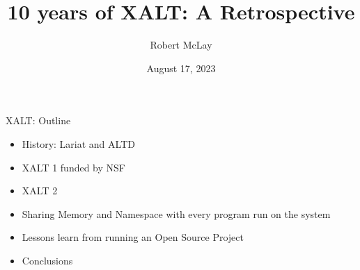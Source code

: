 \documentclass{beamer}
\begin{document}
\title[XALT]{10 years of XALT: A Retrospective}
\author{Robert McLay}
\date{August 17, 2023}

\frame{\titlepage}

\begin{frame}{XALT: Outline}
  \begin{itemize}
    \item History: Lariat and ALTD
    \item XALT 1 funded by NSF
    \item XALT 2
    \item Sharing Memory and Namespace with every program run on the
      system
    \item Lessons learn from running an Open Source Project
    \item Conclusions
  \end{itemize}
\end{frame}
\end{document}
